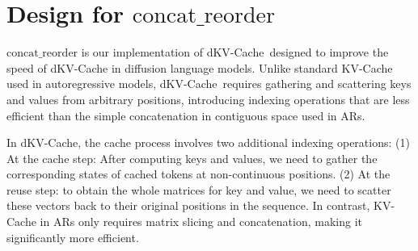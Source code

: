 \documentclass{article}
\newcommand{\methodname}{dKV-Cache}
\begin{document}
\fi 
\clearpage
\appendix


\section{Design for $\operatorname{concat\_{reorder}}$}

$\operatorname{concat\_{reorder}}$ is our implementation of \methodname\ designed to improve the speed of dKV-Cache in diffusion language models.
Unlike standard KV-Cache used in autoregressive models, \methodname\ requires gathering and scattering keys and values from arbitrary positions, introducing indexing operations that are less efficient than the simple concatenation in contiguous space used in ARs.

In dKV-Cache, the cache process involves two additional indexing operations:
(1) At the cache step: After computing keys and values, we need to gather the corresponding states of cached tokens at non-continuous positions.
(2) At the reuse step: to obtain the whole matrices for key and value, we need to scatter these vectors back to their original positions in the sequence.
In contrast, KV-Cache in ARs only requires matrix slicing and concatenation, making it significantly more efficient.
\end{document}
